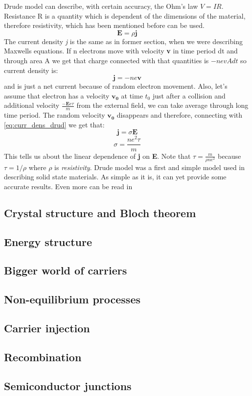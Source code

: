 Drude model can describe, with certain accuracy, the Ohm's law $V=IR$. Resistance R is a quantity which is dependent of the dimensions of the material, therefore resistivity, which has been mentioned before can be used.
\begin{equation}
\mathbf{E}=\rho\mathbf{j}
\end{equation}
The current density \textit{j} is the same as in former section, when we were describing Maxwells equations. If n electrons move with velocity \textbf{v} in time period dt and through area A we get that charge connected with that quantities is $-nevAdt$ so current density is:
\begin{equation}
\mathbf{j}=-ne\mathbf{v}
\label{eq:curr_dens_drud}
\end{equation}
and is just a net current because of random electron movement. 
Also, let's assume that electron has a velocity $\mathbf{v_0}$ at time $t_0$ just after a collision and additional velocity $\frac{-\mathbf{E}e\tau}{m}$ from the external field, we can take average through long time period. The random velocity $\mathbf{v_0}$ disappears and therefore, connecting with \ref{eq:curr_dens_drud} we get that:
\begin{equation}
\mathbf{j}=\sigma\mathbf{E}
\end{equation}
\begin{equation}
\sigma=\frac{ne^2\tau}{m}
\end{equation}
This tells us about the linear dependence of \textbf{j} on \textbf{E}. Note that $\tau = \frac{m}{\rho n e^{2}}$ because $\tau = 1/\rho$ where $\rho$ is \textit{resistivity}.
Drude model was a first and simple model used in describing solid state materials. As simple as it is, it can yet provide some accurate results. Even more can be read in \cite{Aschcroft}








\subsection{Crystal structure and Bloch theorem}

\subsection{Energy structure}

\subsection{Bigger world of carriers}

\subsection{Non-equilibrium processes}

\subsection{Carrier injection}

\subsection{Recombination}

\subsection{Semiconductor junctions}

